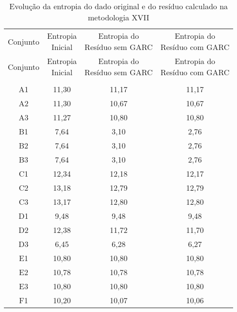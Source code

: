 \clearpage

\begin{center}
\begin{longtable}{cccc}
\toprule
\rowcolor{white}
\caption[Metodologia XVII: evolução da entropia]{Evolução da entropia do dado
original e do resíduo calculado na metodologia XVII}
\label{tab:EvolucaoEntropiaMet17}\\
\midrule
Conjunto & \specialcell{Entropia \\Inicial} & \specialcell{Entropia do
\\Resíduo sem GARC} & \specialcell{Entropia do
\\Resíduo com GARC}  \\
\midrule
\endfirsthead
\midrule
\rowcolor{white}
Conjunto & \specialcell{Entropia \\Inicial} & \specialcell{Entropia do
\\Resíduo sem GARC} & \specialcell{Entropia do
\\Resíduo com GARC}  \\
\toprule
\endhead
\midrule \\ %
\endfoot
\bottomrule 
\endlastfoot
    A1    & 11,30 & 11,17 & 11,17 \\
    A2    & 11,30 & 10,67 & 10,67 \\
    A3    & 11,27 & 10,80 & 10,80 \\
    B1    & 7,64  & 3,10  & 2,76 \\
    B2    & 7,64  & 3,10  & 2,76 \\
    B3    & 7,64  & 3,10  & 2,76 \\
    C1    & 12,34 & 12,18 & 12,17 \\
    C2    & 13,18 & 12,79 & 12,79 \\
    C3    & 13,17 & 12,80 & 12,80 \\
    D1    & 9,48  & 9,48  & 9,48 \\
    D2    & 12,38 & 11,72 & 11,70 \\
    D3    & 6,45  & 6,28  & 6,27 \\
    E1    & 10,80 & 10,80 & 10,80 \\
    E2    & 10,78 & 10,78 & 10,78 \\
    E3    & 10,80 & 10,80 & 10,80 \\
    F1    & 10,20 & 10,07 & 10,06 \\

\end{longtable}
\end{center}
